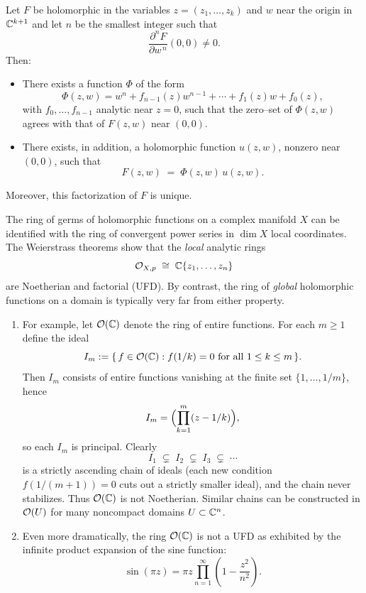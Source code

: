 \documentclass[12pt]{article}
\begin{document}
\begin{theorem}
    Let $F$ be holomorphic in the variables $z = (z_1,\dots,z_k)$ and $w$ near the origin in $\mathbb{C}^{k+1}$ and let $n$ be the smallest integer such that
\[
\frac{\partial^{n}F}{\partial w^{\,n}}(0,0)\neq 0.
\]
Then:

\begin{itemize}
\item[\textnormal{(weak form)}]
There exists a function $\Phi$ of the form
\[
\Phi(z,w)
 = w^{n} + f_{n-1}(z) w^{n-1} + \cdots + f_1(z) w + f_0(z),
\]
with $f_0,\dots,f_{n-1}$ analytic near $z=0$, such that the zero--set of
$\Phi(z,w)$ agrees with that of $F(z,w)$ near $(0,0)$.

\item[\textnormal{(strong form)}]
There exists, in addition, a holomorphic function $u(z,w)$, nonzero near
$(0,0)$, such that
\[
F(z,w) \;=\; \Phi(z,w)\,u(z,w).
\]
\end{itemize}
Moreover, this factorization of $F$ is unique.
\end{theorem}


\begin{example}\label{germs-noetherian}
    The ring of germs of holomorphic functions on a complex manifold $X$ can be identified with the ring of convergent power series in $\dim X$ local coordinates. 
The Weierstrass theorems show that the \emph{local} analytic rings
\[
{\mathcal{O}}_{X,p} \;\cong\; \mathbb{C}\{z_1,\dots,z_n\}
\]
are Noetherian and factorial (UFD). By contrast, the ring of
\emph{global} holomorphic functions on a domain is typically very far
from either property.

\begin{enumerate}
\item
For example, let ${\mathcal{O}}(\mathbb{C})$ denote the ring of entire functions. For
each $m\ge 1$ define the ideal
\[
I_m := \{\, f\in{\mathcal{O}}(\mathbb{C}) : f(1/k)=0 \text{ for all } 1\le k\le m \,\}.
\]
Then $I_m$ consists of entire functions vanishing at the finite set
$\{1,\dots,1/m\}$, hence
\[
I_m = \Bigl(\prod_{k=1}^m (z-1/k)\Bigr),
\]
so each $I_m$ is principal. Clearly
\[
I_1 \;\subsetneq\; I_2 \;\subsetneq\; I_3 \;\subsetneq\; \cdots
\]
is a strictly ascending chain of ideals (each new condition $f(1/(m+1))=0$
cuts out a strictly smaller ideal), and the chain never stabilizes.
Thus ${\mathcal{O}}(\mathbb{C})$ is not Noetherian. Similar chains can be constructed in
${\mathcal{O}}(U)$ for many noncompact domains $U\subset\mathbb{C}^n$.

\item
Even more dramatically, the ring ${\mathcal{O}}(\mathbb{C})$ is not a UFD as exhibited by the infinite product expansion of the sine function:
\[
\sin(\pi z)
= \pi z \prod_{n=1}^\infty \left(1 - \frac{z^2}{n^2}\right).
\]
\end{enumerate}
\end{example}
\end{document}
